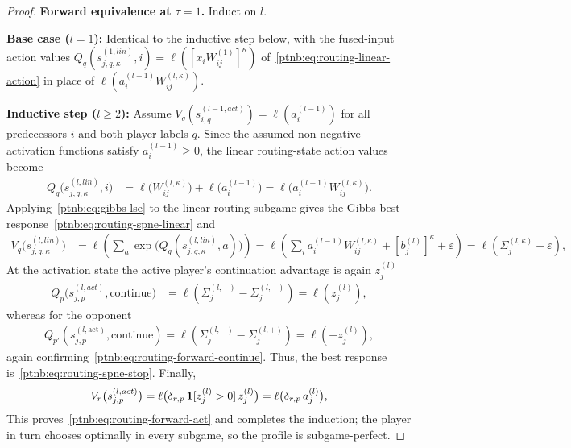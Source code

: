 \begin{proof}
\textbf{Forward equivalence at $\tau = 1$.} Induct on $l$.

\textbf{Base case ($l=1$):} Identical to the inductive step below, with the fused-input action
values $Q_q(s_{j,q,\kappa}^{(1, lin)}, i) = \ell([x_iW_{ij}^{(1)}]^\kappa)$
of~\eqref{ptnb:eq:routing-linear-action} in place of $\ell(a_i^{(l-1)} W_{ij}^{(l,\kappa)})$.

\textbf{Inductive step ($l \ge 2$):} Assume $V_q(s_{i,q}^{(l-1, act)}) = \ell(a_i^{(l-1)})$ for all
predecessors $i$ and both player labels $q$. Since the assumed non-negative activation functions satisfy $a_i^{(l-1)} \ge
    0$, the linear routing-state action values become
    \begin{align}
    Q_q \bigl( s_{j,q,\kappa}^{(l, lin)}, i \bigr)
    &=
    \ell\!\bigl(W_{ij}^{(l,\kappa)}\bigr) + \ell\!\bigl(a_i^{(l-1)}\bigr)
    =
    \ell\!\bigl(a_i^{(l-1)} W_{ij}^{(l,\kappa)}\bigr).
\end{align}
Applying~\eqref{ptnb:eq:gibbs-lse} to the linear routing subgame gives the Gibbs best
response~\eqref{ptnb:eq:routing-spne-linear} and
\begin{align}
    V_q \bigl( s_{j,q,\kappa}^{(l, lin)} \bigr)
    &=
    \ell \left( \sum_a \exp\!\bigl(Q_q(s_{j,q,\kappa}^{(l, lin)}, a)\bigr) \right)
    =
    \ell \left( \sum_i a_i^{(l-1)} W_{ij}^{(l,\kappa)} + [b_j^{(l)}]^\kappa + \varepsilon \right)
    =
    \ell(\Sigma_j^{(l,\kappa)} + \varepsilon),
\end{align}
At the activation state the active player's continuation advantage is again $z_j^{(l)}$
\begin{align}
    Q_p \bigl( s_{j,p}^{(l, act)}, \text{continue} \bigr)
    &=
    \ell \left( \Sigma_j^{(l,+)} - \Sigma_j^{(l,-)} \right)
    =
    \ell(z_j^{(l)}),
\end{align}
whereas for the opponent
\begin{align}
    Q_{p'}\left( s_{j,p}^{(l,\text{act})}, \text{continue} \right)
    = \ell \left( \Sigma_j^{(l,-)} - \Sigma_j^{(l,+)} \right)
    = \ell (-z_j^{(l)}),
\end{align}
again confirming~\eqref{ptnb:eq:routing-forward-continue}.
Thus, the best response is~\eqref{ptnb:eq:routing-spne-stop}. Finally,
\begin{align}
    V_r \bigl( s_{j,p}^{(l, act)} \bigr) = \ell\bigl(\delta_{r,p}\, \mathbf{1}[z_j^{(l)} > 0]\, z_j^{(l)}\bigr)
    = \ell\bigl(\delta_{r,p}\, a_j^{(l)}\bigr),
\end{align}
This proves~\eqref{ptnb:eq:routing-forward-act} and completes the induction; the player in turn
chooses optimally in every subgame, so the profile is subgame-perfect.
\end{proof}

